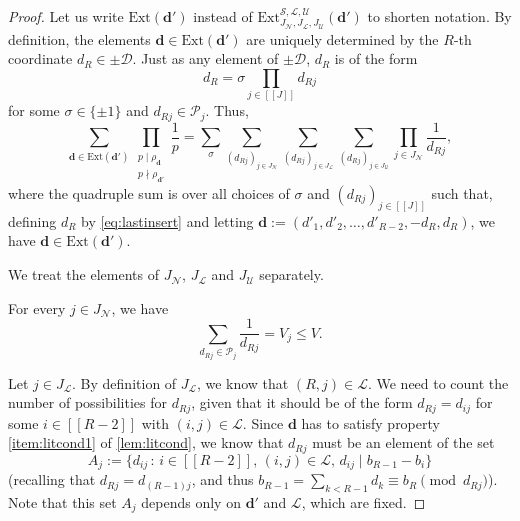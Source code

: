 \documentclass[11pt]{amsart}
\theoremstyle{definition}
\renewcommand{\leq}{\leqslant}
\newcommand{\sinterval}[1]{[\![#1]\!] }
\newcommand{\primes}{\mathcal{P}}
\newcommand{\D}{\mathcal{D}}
\renewcommand{\d}{\boldsymbol{d}}
\newcommand{\pcomp}[2]{d_{#1#2}}
\newcommand{\curlyL}{V}
\newcommand{\sommespart}{b}
\newcommand{\fprod}[1]{\rho_{#1}}
\newcommand{\pall}{\fprod{\d}}
\newcommand{\pallprime}{\fprod{\d'}}
\newcommand{\ext}{\mathrm{Ext}}
\newcommand{\lit}{\mathcal{L}}
\newcommand{\unlit}{\mathcal{U}}
\newcommand{\s}{\mathcal{S}}
\newcommand{\new}{\mathcal{N}}
\newcommand{\newR}{\sinterval{J}}
\newcommand{\tupsize}{R}
\newcommand{\somesigns}{\sigma}
\begin{document}
\begin{proof}
Let us write $\ext(\d')$ instead of $\ext_{J_{\new}, J_{\lit}, J_{\unlit}}^{\s,\lit,\unlit}(\d')$ to shorten notation. By definition, the elements $\d \in \ext(\d')$ are uniquely determined by the $\tupsize$-th coordinate $d_{\tupsize}\in \pm\D$. Just as any element of $\pm \D$, $d_{\tupsize}$ is of the form 
\begin{equation}
\label{eq:lastinsert}
	d_{\tupsize} = \somesigns \prod_{j\in \newR} \pcomp{\tupsize}{j}
\end{equation}
for some $\somesigns\in \{\pm1\}$ and $\pcomp{\tupsize}{j}\in \primes_j$. Thus,
\begin{equation}
\label{eq:insertsplit}
	\sum_{\d \in \ext(\d')}   \prod_{\substack{p\mid \pall\\ p\nmid \pallprime}} \frac{1}{p}
	= \sum_{\somesigns}  \sum_{(\pcomp{\tupsize}{j})_{j\in J_{\new}}}  \sum_{(\pcomp{\tupsize}{j})_{j\in J_{\lit}}}  \sum_{(\pcomp{\tupsize}{j})_{j\in J_{\unlit}}} \prod_{j\in J_{\new}} \frac{1}{\pcomp{\tupsize}{j}},
\end{equation}
where the quadruple sum is over all choices of $\somesigns$ and $(\pcomp{\tupsize}{j})_{j\in \newR}$ such that, defining $d_{\tupsize}$ by \cref{eq:lastinsert} and letting $\d := (d'_1, d'_2, \ldots, d'_{\tupsize-2}, -d_{\tupsize}, d_{\tupsize})$, we have $\d \in \ext(\d')$.

We treat the elements of $J_{\new}$, $J_{\lit}$ and $J_{\unlit}$ separately.

For every $j\in J_{\new}$, we have
\begin{equation}
\label{eq:Jnew}
	\sum_{\pcomp{\tupsize}{j}\in \primes_j} \frac{1}{\pcomp{\tupsize}{j}} = \curlyL_j \leq \curlyL.
\end{equation}

Let $j\in J_{\lit}$. By definition of $J_{\lit}$, we know that $(\tupsize, j)\in \lit$. We need to count the number of possibilities for $\pcomp{\tupsize}{j}$, given that it should be of the form $\pcomp{\tupsize}{j} = \pcomp{i}{j}$ for some $i\in \sinterval{\tupsize-2}$ with $(i,j)\in \lit$. Since $\d$ has to satisfy property \cref{item:litcond1} of \cref{lem:litcond}, we know that $\pcomp{\tupsize}{j}$ must be an element of the set
\begin{equation*}
	A_j := \{\pcomp{i}{j} \, :\,  i\in \sinterval{\tupsize-2}, \, (i,j)\in \lit, \, \pcomp{i}{j} \mid \sommespart_{\tupsize-1} - \sommespart_{i}\}
\end{equation*}
(recalling that $\pcomp{\tupsize}{j} = \pcomp{(\tupsize-1)}{j}$, and thus $\sommespart_{\tupsize-1} = \sum_{k<\tupsize-1} d_k \equiv \sommespart_{\tupsize}\pmod {\pcomp{\tupsize}{j}}$). Note that this set $A_j$ depends only on $\d'$ and $\lit$, which are fixed.


\end{proof}
\end{document}
